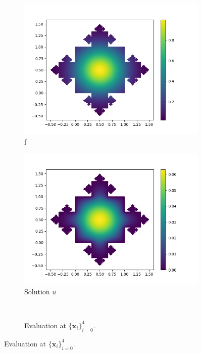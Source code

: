 \documentclass[12pt]{article}%
\theoremstyle{plain}
\numberwithin{equation}{section}
\begin{document}
  
    \begin{figure}[H]%
    \centering
         \begin{subfigure}[h]{0.45\linewidth}
         \caption{f}
\includegraphics[width=\linewidth]{figures/Ex3/Ex3_f_2.png}
\end{subfigure}
 \begin{subfigure}[h]{0.45\linewidth}
         \caption{Solution $u$}
\includegraphics[width=\linewidth]{figures/Ex3/Ex3_solution_2.png}
\end{subfigure}
\\
\begin{subfigure}[h]{0.45\linewidth}
\caption{Evaluation at $\{\textbf{x}_i\}_{i=0}^4$.}

\end{subfigure}
\end{figure}
\end{document}
